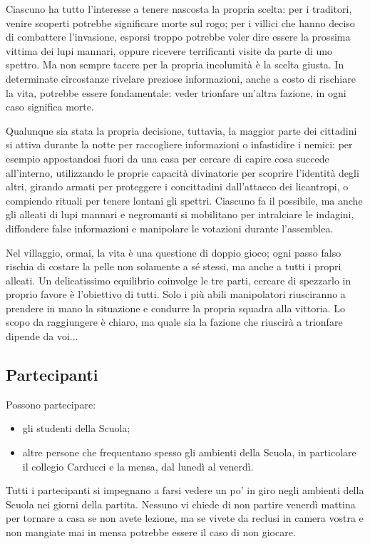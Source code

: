 \documentclass[a4paper,10pt]{article}
\begin{document}
Ciascuno ha tutto l'interesse a tenere nascosta la propria scelta: per i traditori, venire scoperti potrebbe significare morte sul rogo; per i villici che hanno deciso di combattere l'invasione, esporsi troppo potrebbe voler dire essere la prossima vittima dei lupi mannari, oppure ricevere terrificanti visite da parte di uno spettro. Ma non sempre tacere per la propria incolumità è la scelta giusta. In determinate circostanze rivelare preziose informazioni, anche a costo di rischiare la vita, potrebbe essere fondamentale: veder trionfare un'altra fazione, in ogni caso significa morte.

Qualunque sia stata la propria decisione, tuttavia, la maggior parte dei cittadini si attiva durante la notte per raccogliere informazioni o infastidire i nemici: per esempio appostandosi fuori da una casa per cercare di capire cosa succede all'interno, utilizzando le proprie capacità divinatorie per scoprire l'identità degli altri, girando armati per proteggere i concittadini dall'attacco dei licantropi, o compiendo rituali per tenere lontani gli spettri. Ciascuno fa il possibile, ma anche gli alleati di lupi mannari e negromanti si mobilitano per intralciare le indagini, diffondere false informazioni e manipolare le votazioni durante l'assemblea.

Nel villaggio, ormai, la vita è una questione di doppio gioco; ogni passo falso rischia di costare la pelle non solamente a sé stessi, ma anche a tutti i propri alleati. Un delicatissimo equilibrio coinvolge le tre parti, cercare di spezzarlo in proprio favore è l'obiettivo di tutti. Solo i più abili manipolatori riusciranno a prendere in mano la situazione e condurre la propria squadra alla vittoria. Lo scopo da raggiungere è chiaro, ma quale sia la fazione che riuscirà a trionfare dipende da voi...


\subsection{Partecipanti}
Possono partecipare:
\begin{itemize}
 \item gli studenti della Scuola;
 \item altre persone che frequentano spesso gli ambienti della Scuola, in particolare il collegio Carducci e la mensa, dal lunedì al venerdì.
\end{itemize}
Tutti i partecipanti si impegnano a farsi vedere un po' in giro negli ambienti della Scuola nei giorni della partita. Nessuno vi chiede di non partire venerdì mattina per tornare a casa se non avete lezione, ma se vivete da reclusi in camera vostra e non mangiate mai in mensa potrebbe essere il caso di non giocare.
\end{document}
